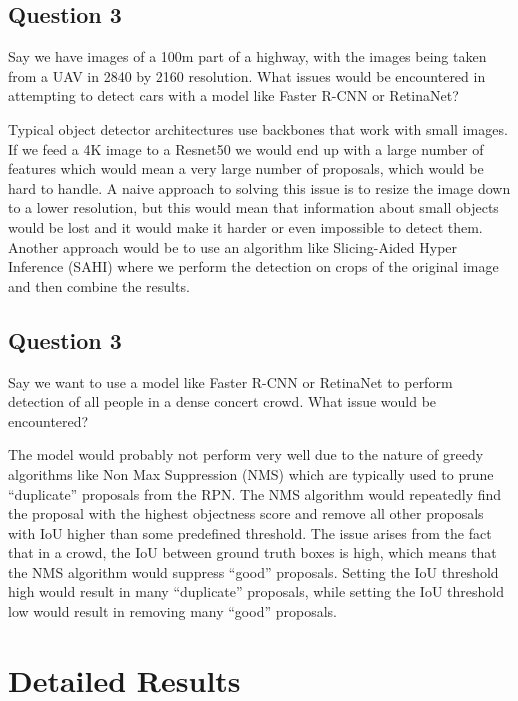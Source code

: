 \documentclass{article}
\begin{document}
\subsection{Question 3}
\begin{tcolorbox}
    Say we have images of a 100m part of a highway, with the images being taken from a UAV in 2840 by 2160 resolution. What issues would be encountered in attempting to detect cars with a model like Faster R-CNN or RetinaNet?
\end{tcolorbox}
Typical object detector architectures use backbones that work with small images. If we feed a 4K image to a Resnet50 we would end up with a large number of features which would mean a very large number of proposals, which would be hard to handle. A naive approach to solving this issue is to resize the image down to a lower resolution, but this would mean that information about small objects would be lost and it would make it harder or even impossible to detect them. Another approach would be to use an algorithm like Slicing-Aided Hyper Inference (SAHI) \cite{sahi} where we perform the detection on crops of the original image and then combine the results.

\subsection{Question 3}
\begin{tcolorbox}
    Say we want to use a model like Faster R-CNN or RetinaNet to perform detection of all people in a dense concert crowd. What issue would be encountered?
\end{tcolorbox}
The model would probably not perform very well due to the nature of greedy algorithms like Non Max Suppression (NMS) which are typically used to prune “duplicate” proposals from the RPN. The NMS algorithm would repeatedly find the proposal with the highest objectness score and remove all other proposals with IoU higher than some predefined threshold. The issue arises from the fact that in a crowd, the IoU between ground truth boxes is high, which means that the NMS algorithm would suppress “good” proposals. Setting the IoU threshold high would result in many “duplicate” proposals, while setting the IoU threshold low would result in removing many “good” proposals.






\appendix

\section{Detailed Results}
\label{appendix:results}
\end{document}
